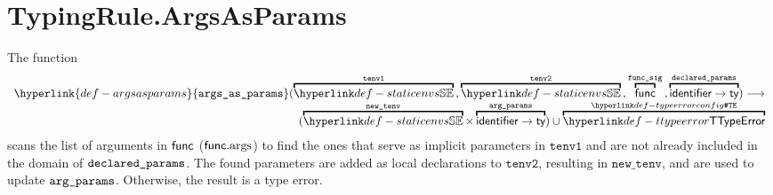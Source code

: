 \documentclass{book}
\newcommand\argsasparams[0]{\hyperlink{def-argsasparams}{\texttt{args\_as\_params}}}
\newcommand\newtenv[0]{\texttt{new\_tenv}}
\newcommand\tenvone[0]{\texttt{tenv1}}
\newcommand\tenvtwo[0]{\texttt{tenv2}}
\begin{document}
\section{TypingRule.ArgsAsParams \label{sec:TypingRule.ArgsAsParams}}
\hypertarget{def-argsasparams}{}
The function
\[
\begin{array}{r}
\argsasparams(
  \overname{\staticenvs}{\tenvone} \aslsep
  \overname{\staticenvs}{\tenvtwo} \aslsep
  \overname{\func}{\funcsig} \aslsep
  \overname{\identifier\rightarrow\ty}{\declaredparams}
  )
\aslto \\
(\overname{\staticenvs}{\newtenv} \times \overname{\identifier\rightarrow\ty}{\argparams})
\cup \overname{\TTypeError}{\TypeErrorConfig}
\end{array}
\]
scans the list of arguments in $\textsf{func}$ ($\textsf{func}.\text{args}$) to find the ones that serve as
implicit parameters in $\tenvone$ and are not already included in the domain of $\texttt{declared\_params}$.
The found parameters are added as local declarations to $\tenvtwo$, resulting in $\newtenv$,
and are used to update $\texttt{arg\_params}$.
Otherwise, the result is a type error.
\end{document}
